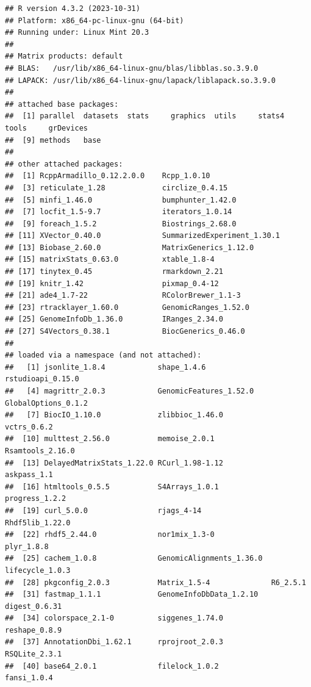 \documentclass[
  10pt,
]{article}
\begin{document}
\begin{verbatim}
## R version 4.3.2 (2023-10-31)
## Platform: x86_64-pc-linux-gnu (64-bit)
## Running under: Linux Mint 20.3
## 
## Matrix products: default
## BLAS:   /usr/lib/x86_64-linux-gnu/blas/libblas.so.3.9.0 
## LAPACK: /usr/lib/x86_64-linux-gnu/lapack/liblapack.so.3.9.0
## 
## attached base packages:
##  [1] parallel  datasets  stats     graphics  utils     stats4    tools     grDevices
##  [9] methods   base     
## 
## other attached packages:
##  [1] RcppArmadillo_0.12.2.0.0    Rcpp_1.0.10                
##  [3] reticulate_1.28             circlize_0.4.15            
##  [5] minfi_1.46.0                bumphunter_1.42.0          
##  [7] locfit_1.5-9.7              iterators_1.0.14           
##  [9] foreach_1.5.2               Biostrings_2.68.0          
## [11] XVector_0.40.0              SummarizedExperiment_1.30.1
## [13] Biobase_2.60.0              MatrixGenerics_1.12.0      
## [15] matrixStats_0.63.0          xtable_1.8-4               
## [17] tinytex_0.45                rmarkdown_2.21             
## [19] knitr_1.42                  pixmap_0.4-12              
## [21] ade4_1.7-22                 RColorBrewer_1.1-3         
## [23] rtracklayer_1.60.0          GenomicRanges_1.52.0       
## [25] GenomeInfoDb_1.36.0         IRanges_2.34.0             
## [27] S4Vectors_0.38.1            BiocGenerics_0.46.0        
## 
## loaded via a namespace (and not attached):
##   [1] jsonlite_1.8.4            shape_1.4.6               rstudioapi_0.15.0        
##   [4] magrittr_2.0.3            GenomicFeatures_1.52.0    GlobalOptions_0.1.2      
##   [7] BiocIO_1.10.0             zlibbioc_1.46.0           vctrs_0.6.2              
##  [10] multtest_2.56.0           memoise_2.0.1             Rsamtools_2.16.0         
##  [13] DelayedMatrixStats_1.22.0 RCurl_1.98-1.12           askpass_1.1              
##  [16] htmltools_0.5.5           S4Arrays_1.0.1            progress_1.2.2           
##  [19] curl_5.0.0                rjags_4-14                Rhdf5lib_1.22.0          
##  [22] rhdf5_2.44.0              nor1mix_1.3-0             plyr_1.8.8               
##  [25] cachem_1.0.8              GenomicAlignments_1.36.0  lifecycle_1.0.3          
##  [28] pkgconfig_2.0.3           Matrix_1.5-4              R6_2.5.1                 
##  [31] fastmap_1.1.1             GenomeInfoDbData_1.2.10   digest_0.6.31            
##  [34] colorspace_2.1-0          siggenes_1.74.0           reshape_0.8.9            
##  [37] AnnotationDbi_1.62.1      rprojroot_2.0.3           RSQLite_2.3.1            
##  [40] base64_2.0.1              filelock_1.0.2            fansi_1.0.4              

\end{verbatim}
\end{document}
